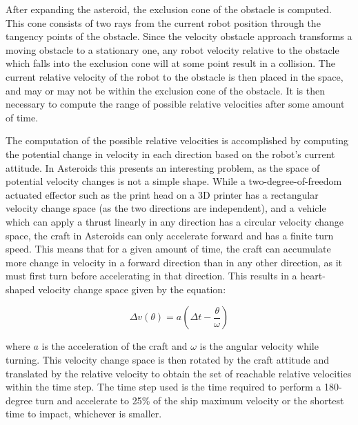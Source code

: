 \documentclass[10pt,final,conference]{IEEEtran}
\begin{document}
After expanding the asteroid, the exclusion cone of the obstacle is computed. This cone consists of two rays from the current robot position through the tangency points of the obstacle. Since the velocity obstacle approach transforms a moving obstacle to a stationary one, any robot velocity relative to the obstacle which falls into the exclusion cone will at some point result in a collision. The current relative velocity of the robot to the obstacle is then placed in the space, and may or may not be within the exclusion cone of the obstacle. It is then necessary to compute the range of possible relative velocities after some amount of time.

The computation of the possible relative velocities is accomplished by computing the potential change in velocity in each direction based on the robot's current attitude. In Asteroids this presents an interesting problem, as the space of potential velocity changes is not a simple shape. While a two-degree-of-freedom actuated effector such as the print head on a 3D printer has a rectangular velocity change space (as the two directions are independent), and a vehicle which can apply a thrust linearly in any direction has a circular velocity change space, the craft in Asteroids can only accelerate forward and has a finite turn speed. This means that for a given amount of time, the craft can accumulate more change in velocity in a forward direction than in any other direction, as it must first turn before accelerating in that direction. This results in a heart-shaped velocity change space given by the equation:

\begin{equation*}
\Delta v(\theta) = a \left( \Delta t - \frac{\theta}{\omega} \right)
\end{equation*}

where $a$ is the acceleration of the craft and $\omega$ is the angular velocity while turning. This velocity change space is then rotated by the craft attitude and translated by the relative velocity to obtain the set of reachable relative velocities within the time step. The time step used is the time required to perform a 180-degree turn and accelerate to 25\% of the ship maximum velocity or the shortest time to impact, whichever is smaller. 
\end{document}

